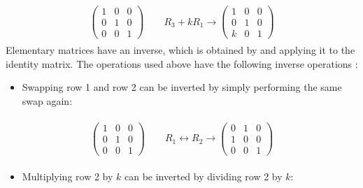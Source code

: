 \documentclass[letterpaper,10pt,english]{jupyterBook}
\begin{document}
\begin{equation*}
\begin{split} \begin{align*}
    \begin{pmatrix} 1 & 0 & 0 \\ 0 & 1 & 0 \\ 0 & 0 & 1 \end{pmatrix}
    \qquad R_3 + kR_1 \longrightarrow
    \begin{pmatrix} 1 & 0 & 0 \\ 0 & 1 & 0 \\ k & 0 & 1 \end{pmatrix}
\end{align*} \end{split}
\end{equation*}
\sphinxAtStartPar
Elementary matrices have an inverse, which is obtained by  and applying it to the identity matrix. The operations used above have the following inverse operations :
\begin{itemize}
\item {} 
\sphinxAtStartPar
Swapping row 1 and row 2 can be inverted by simply performing the same swap again:

\end{itemize}
\begin{equation*}
\begin{split} \begin{align*}
    \begin{pmatrix} 1 & 0 & 0 \\ 0 & 1 & 0 \\ 0 & 0 & 1 \end{pmatrix}
    \qquad R_1 \leftrightarrow R_2 \longrightarrow
    \begin{pmatrix} 0 & 1 & 0 \\ 1 & 0 & 0 \\ 0 & 0 & 1 \end{pmatrix}
\end{align*} \end{split}
\end{equation*}\begin{itemize}
\item {} 
\sphinxAtStartPar
Multiplying row 2 by \(k\) can be inverted by dividing row 2 by \(k\):

\end{itemize}
\end{document}
